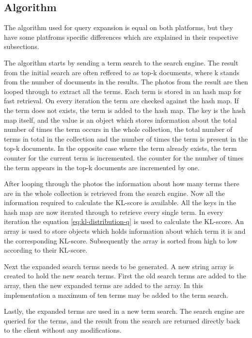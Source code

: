 \subsection{Algorithm}
The algorithm used for query expansion is equal on both platforms,
but they have some platfroms specific differences which are explained in their respective subsections.

The algorithm starts by sending a term search to the search engine.
The result from the initial search are often reffered to as top-k documents,
where k stands from the number of documents in the results.
The photos from the result are then looped through to extract all the terms.
Each term is stored in an hash map for fast retrieval.
On every iteration the term are checked against the hash map.
If the term does not exists,
the term is added to the hash map.
The key is the hash map itself,
and the value is an object which stores information about the total number of times the term occurs in the whole collection,
the total number of terms in total in the collection and the number of times the term is present in the top-k documents.
In the opposite case where the term already exists, the term counter for the current term is incremented.
the counter for the number of times the term appears in the top-k documents are incremented by one.

After looping through the photos the information about how many terms there are in the whole collection is retrieved from the search engine.
Now all the information required to calculate the KL-score is available.
All the keys in the hash map are now iterated through to retrieve every single term.
In every iteration the equation \ref{eq:kl-distribution-q} is used to calculate the KL-score.
An array is used to store objects which holds information about which term it is and the corresponding KL-score.
Subsequently the array is sorted from high to low according to their KL-score.

Next the expanded search terms needs to be generated.
A new string array is created to hold the new search terms.
First the old search terms are added to the array,
then the new expanded terms are added to the array.
In this implementation a maximum of ten terms may be added to the term search.

Lastly, the expanded terms are used in a new term search.
The search engine are queried for the terms,
and the result from the search are returned directly back to the client without any modifications.

